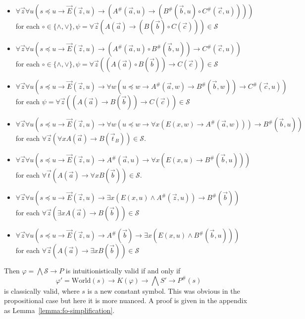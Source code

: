 \documentclass[a4paper,UKenglish,cleveref, autoref, thm-restate]{lipics-v2021}
\begin{document}
\begin{itemize}
	\item $\forall \vec z\forall u(s\preceq u\to \vec E(\vec z, u)\to (A^\#(\vec a, u)\to (B^\#(\vec b, u)\circ C^\#(\vec c, u))))$\\for each $\circ\in\{\wedge, \vee\}, \psi = \forall \vec z(A(\vec a)\to (B(\vec b)\circ C(\vec c)))\in\mathcal S$
	\item $\forall \vec z\forall u(s\preceq u\to\vec E(\vec z, u)\to (A^\#(\vec a, u)\circ B^\#(\vec b, u))\to C^\#(\vec c, u))$\\for each $\circ\in\{\wedge, \vee\}, \psi = \forall \vec z((A(\vec a)\circ B(\vec b))\to C(\vec c))\in\mathcal S$
	\item $\forall \vec z\forall u(s\preceq u\to\vec E(\vec z, u)\to\forall w(u\preceq w\to A^\#(\vec a, w)\to B^\#(\vec b, w))\to C^\#(\vec c, u))$\\ for each $\psi = \forall \vec z((A(\vec a)\to B(\vec b))\to C(\vec c))\in\mathcal S$
	\item  $\forall \vec z\forall u(s\preceq u\to\vec E(\vec z, u)\to \forall w(u\preceq w\to \forall x(E(x, w)\to A^\#(\vec a, w)))\to B^\#(\vec b, u))$\\for each $\forall \vec z(\forall xA(\vec a)\to B(\vec t_B))\in\mathcal S$.
	\item $\forall \vec z\forall u(s\preceq u\to\vec E(\vec z, u)\to A^\#(\vec a, u)\to \forall x(E(x, u)\to B^\#(\vec b, u)))$\\for each $\forall \vec t(A(\vec a)\to \forall xB(\vec b))\in\mathcal S$.
	\item $\forall \vec z\forall u(s\preceq u\to\vec E(\vec z, u)\to \exists x(E(x, u)\wedge A^\#(\vec z, u))\to B^\#(\vec b))$\\for each $\forall \vec z(\exists xA(\vec a)\to B(\vec b))\in\mathcal S$
	\item $\forall \vec z\forall u(s\preceq u\to\vec E(\vec z, u)\to A^\#(\vec b)\to \exists x(E(x, u)\wedge B^\#(\vec b, u)))$\\for each $\forall \vec z(A(\vec a)\to \exists xB(\vec b))\in\mathcal S$
\end{itemize}

Then $\varphi = \bigwedge\mathcal S\to P$ is intuitionistically valid if and only if
$$\varphi' = \text{World}(s)\to K(\varphi)\to \bigwedge S'\to P^\#(s)$$
is classically valid, where $s$ is a new constant symbol. This was obvious in the propositional case but here it is more nuanced. A proof is given in the appendix as Lemma~\ref{lemma:fo-simplification}.
\end{document}
